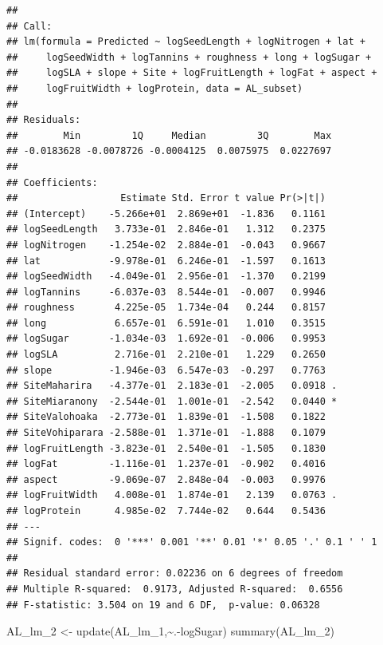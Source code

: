 \documentclass[
  12pt,
]{article}
\newenvironment{Shaded}{\begin{snugshade}}{\end{snugshade}}
\newcommand{\FunctionTok}[1]{\textcolor[rgb]{0.00,0.00,0.00}{#1}}
\newcommand{\NormalTok}[1]{#1}
\newcommand{\OtherTok}[1]{\textcolor[rgb]{0.56,0.35,0.01}{#1}}
\newcommand{\SpecialCharTok}[1]{\textcolor[rgb]{0.00,0.00,0.00}{#1}}
\begin{document}
\begin{verbatim}
## 
## Call:
## lm(formula = Predicted ~ logSeedLength + logNitrogen + lat + 
##     logSeedWidth + logTannins + roughness + long + logSugar + 
##     logSLA + slope + Site + logFruitLength + logFat + aspect + 
##     logFruitWidth + logProtein, data = AL_subset)
## 
## Residuals:
##        Min         1Q     Median         3Q        Max 
## -0.0183628 -0.0078726 -0.0004125  0.0075975  0.0227697 
## 
## Coefficients:
##                  Estimate Std. Error t value Pr(>|t|)  
## (Intercept)    -5.266e+01  2.869e+01  -1.836   0.1161  
## logSeedLength   3.733e-01  2.846e-01   1.312   0.2375  
## logNitrogen    -1.254e-02  2.884e-01  -0.043   0.9667  
## lat            -9.978e-01  6.246e-01  -1.597   0.1613  
## logSeedWidth   -4.049e-01  2.956e-01  -1.370   0.2199  
## logTannins     -6.037e-03  8.544e-01  -0.007   0.9946  
## roughness       4.225e-05  1.734e-04   0.244   0.8157  
## long            6.657e-01  6.591e-01   1.010   0.3515  
## logSugar       -1.034e-03  1.692e-01  -0.006   0.9953  
## logSLA          2.716e-01  2.210e-01   1.229   0.2650  
## slope          -1.946e-03  6.547e-03  -0.297   0.7763  
## SiteMaharira   -4.377e-01  2.183e-01  -2.005   0.0918 .
## SiteMiaranony  -2.544e-01  1.001e-01  -2.542   0.0440 *
## SiteValohoaka  -2.773e-01  1.839e-01  -1.508   0.1822  
## SiteVohiparara -2.588e-01  1.371e-01  -1.888   0.1079  
## logFruitLength -3.823e-01  2.540e-01  -1.505   0.1830  
## logFat         -1.116e-01  1.237e-01  -0.902   0.4016  
## aspect         -9.069e-07  2.848e-04  -0.003   0.9976  
## logFruitWidth   4.008e-01  1.874e-01   2.139   0.0763 .
## logProtein      4.985e-02  7.744e-02   0.644   0.5436  
## ---
## Signif. codes:  0 '***' 0.001 '**' 0.01 '*' 0.05 '.' 0.1 ' ' 1
## 
## Residual standard error: 0.02236 on 6 degrees of freedom
## Multiple R-squared:  0.9173, Adjusted R-squared:  0.6556 
## F-statistic: 3.504 on 19 and 6 DF,  p-value: 0.06328
\end{verbatim}

\begin{Shaded}
\begin{Highlighting}[]
\NormalTok{AL\_lm\_2 }\OtherTok{\textless{}{-}} \FunctionTok{update}\NormalTok{(AL\_lm\_1,}\SpecialCharTok{\textasciitilde{}}\NormalTok{.}\SpecialCharTok{{-}}\NormalTok{logSugar)}
\FunctionTok{summary}\NormalTok{(AL\_lm\_2)}
\end{Highlighting}
\end{Shaded}
\end{document}
